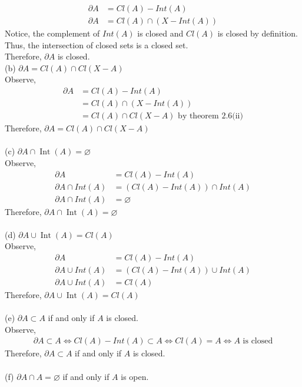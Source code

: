 \documentclass[12pt]{article}
\begin{document}
\begin{enumerate}
\begin{align*}
				 \partial A &= Cl(A)-Int(A)\\
				 \partial A &= Cl(A)\cap (X-Int(A))  
			\end{align*}
			Notice, the complement of $ Int(A) $ is closed and $Cl(A)$ is closed by definition. Thus, the intersection of closed sets is a closed set.\\
			Therefore, $ \partial A $ is closed.
		\\(b) $\partial A=Cl(A) \cap Cl(X-A)$\\
			Observe,
			\begin{align*}
				\partial A &= Cl(A)-Int(A)\\
						   &= Cl(A)\cap(X-Int(A))\\
						   &= Cl(A)\cap Cl(X-A) \text{ by theorem 2.6(ii)}
			\end{align*}
			Therefore,  $\partial A=Cl(A) \cap Cl(X-A)$\\
		\\(c) $\partial A \cap \operatorname{Int}(A)=\varnothing$\\
			Observe,
			\begin{align*}
				\partial A &= Cl(A)-Int(A)\\
				\partial A \cap Int(A) &= (Cl(A)-Int(A))\cap Int(A)\\
				\partial A \cap Int(A) &= \varnothing
			\end{align*}
			Therefore,  $\partial A \cap \operatorname{Int}(A)=\varnothing$\\
		\\(d) $\partial A \cup \operatorname{Int}(A)=C l(A)$\\
			Observe,
			\begin{align*}
				\partial A &= Cl(A)-Int(A)\\
				\partial A \cup Int(A) &= (Cl(A)-Int(A))\cup Int(A)\\
				\partial A \cup Int(A) &= Cl(A)
			\end{align*}
		Therefore, $\partial A \cup \operatorname{Int}(A)=C l(A)$\\
		\\(e) $\partial A \subset A$ if and only if $A$ is closed.\\
		Observe,
		\begin{align*}
			\partial A \subset A \Leftrightarrow Cl(A)-Int(A)\subset A \Leftrightarrow Cl(A)=A \Leftrightarrow A \text{ is closed}
		\end{align*}
		Therefore, $\partial A \subset A$ if and only if $A$ is closed.\\
		\\(f) $\partial A \cap A=\varnothing$ if and only if $A$ is open.\\

\end{enumerate}
\end{document}
